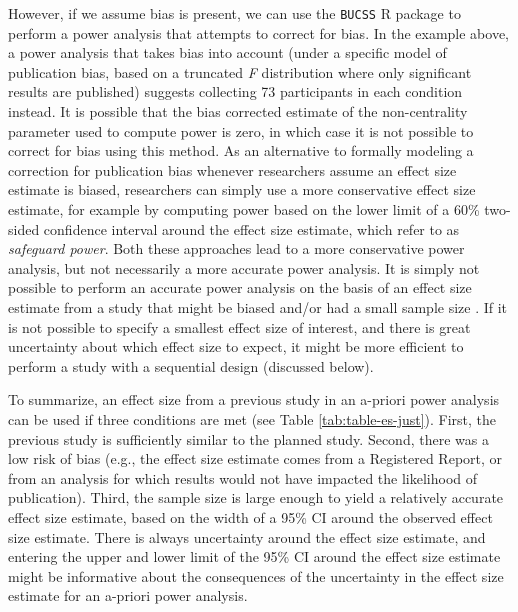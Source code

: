 \documentclass[
  oneside]{krantz}
\begin{document}
However, if we assume bias is present, we can use the \texttt{BUCSS} R package \citep{anderson_sample-size_2017} to perform a power analysis that attempts to correct for bias. In the example above, a power analysis that takes bias into account (under a specific model of publication bias, based on a truncated \emph{F} distribution where only significant results are published) suggests collecting 73 participants in each condition instead. It is possible that the bias corrected estimate of the non-centrality parameter used to compute power is zero, in which case it is not possible to correct for bias using this method. As an alternative to formally modeling a correction for publication bias whenever researchers assume an effect size estimate is biased, researchers can simply use a more conservative effect size estimate, for example by computing power based on the lower limit of a 60\% two-sided confidence interval around the effect size estimate, which \citet{perugini_safeguard_2014} refer to as \emph{safeguard power}. Both these approaches lead to a more conservative power analysis, but not necessarily a more accurate power analysis. It is simply not possible to perform an accurate power analysis on the basis of an effect size estimate from a study that might be biased and/or had a small sample size \citep{teare_sample_2014}. If it is not possible to specify a smallest effect size of interest, and there is great uncertainty about which effect size to expect, it might be more efficient to perform a study with a sequential design (discussed below).

To summarize, an effect size from a previous study in an a-priori power analysis can be used if three conditions are met (see Table \ref{tab:table-es-just}). First, the previous study is sufficiently similar to the planned study. Second, there was a low risk of bias (e.g., the effect size estimate comes from a Registered Report, or from an analysis for which results would not have impacted the likelihood of publication). Third, the sample size is large enough to yield a relatively accurate effect size estimate, based on the width of a 95\% CI around the observed effect size estimate. There is always uncertainty around the effect size estimate, and entering the upper and lower limit of the 95\% CI around the effect size estimate might be informative about the consequences of the uncertainty in the effect size estimate for an a-priori power analysis.
\end{document}
